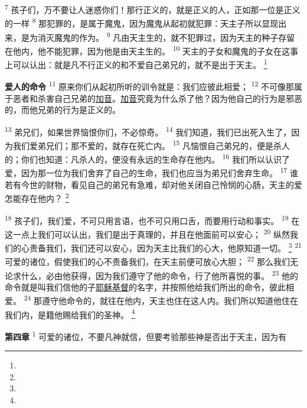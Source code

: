 \begin{multicols}{2}
\textsuperscript{7}
孩子们，万不要让人迷惑你们！那行正义的，就是正义的人，正如那一位是正义的一样
\textsuperscript{8}
那犯罪的，是属于魔鬼，因为魔鬼从起初就犯罪：天主子所以显现出来，是为消灭魔鬼的作为。
\textsuperscript{9}
凡由天主生的，就不犯罪过，因为天主的种子存留在他内，他不能犯罪，因为他是由天主生的。
\textsuperscript{10}
天主的子女和魔鬼的子女在这事上可以认出：就是凡不行正义的和不爱自己弟兄的，就不是出于天主。
\footnote{}

\textbf{爱人的命令\quad}
\textsuperscript{11}
原来你们从起初所听的训令就是：我们应彼此相爱；
\textsuperscript{12}
不可像那属于恶者和杀害自己兄弟的\uline{加音}。\uline{加音}究竟为什么杀了他？因为他自己的行为是邪恶的，而他兄弟的行为是正义的。

\textsuperscript{13}
弟兄们，如果世界恼恨你们，不必惊奇。
\textsuperscript{14}
我们知道，我们已出死入生了，因为我们爱弟兄们；那不爱的，就存在死亡内。
\textsuperscript{15}
凡恼恨自己弟兄的，便是杀人的；你们也知道：凡杀人的，便没有永远的生命存在他内。
\textsuperscript{16}
我们所以认识了爱，因为那一位为我们舍弃了自己的生命，我们也应当为弟兄们舍弃生命。
\textsuperscript{17}
谁若有今世的财物，看见自己的弟兄有急难，却对他关闭自己怜悯的心肠，天主的爱怎能存在他内？
\footnote{}

\textsuperscript{18}
孩子们，我们爱，不可只用言语，也不可只用口舌，而要用行动和事实。
\textsuperscript{19}
在这一点上我们可以认出，我们是出于真理的，并且在他面前可以安心；
\textsuperscript{20}
纵然我们的心责备我们，我们还可以安心，因为天主比我们的心大，他原知道一切。
\footnote{}
\textsuperscript{21}
可爱的诸位，假使我们的心不责备我们，在天主前便可放心大胆；
\textsuperscript{22}
那么我们无论求什么，必由他获得，因为我们遵守了他的命令，行了他所喜悦的事。
\textsuperscript{23}
他的命令就是叫我们信他的子\uline{耶稣}\uline{基督}的名字，并按照他给我们所出的命令，彼此相爱。
\textsuperscript{24}
那遵守他命令的，就往在他内，天主也住在这人内。我们所以知道他住在我们内，是籍他赐给我们的圣神。
\footnote{}

\textbf{第四章\quad}
\textsuperscript{1}
可爱的诸位，不要凡神就信，但要考验那些神是否出于天主，因为有

\end{multicols}